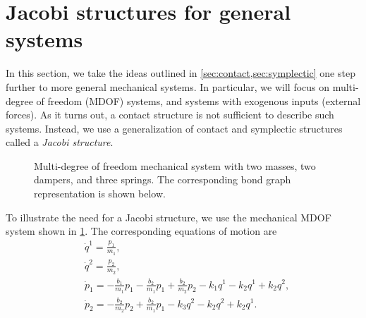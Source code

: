 \section{Jacobi structures for general systems}
\label{sec:jacobi}
In this section, we take the ideas outlined in \cref{sec:contact,sec:symplectic} one step further to more general mechanical systems. In particular, we will focus on multi-degree of freedom (MDOF) systems, and systems with exogenous inputs (external forces). As it turns out, a contact structure is not sufficient to describe such systems. Instead, we use a generalization of contact and symplectic structures called a \emph{Jacobi structure}.

\begin{figure}[ht!]
    \centering
    
    \caption{Multi-degree of freedom mechanical system with two masses, two dampers, and three springs. The corresponding bond graph representation is shown below.}
    \label{fig:mdof_oscillator}
\end{figure}

To illustrate the need for a Jacobi structure, we use the mechanical MDOF system shown in \cref{fig:mdof_oscillator}. The corresponding equations of motion are
\begin{equation}
    \begin{split}
        &\dot{q}^1 = \frac{p_1}{m_1}, \\
        &\dot{q}^2 = \frac{p_2}{m_2}, \\
        &\dot{p}_1 = -\frac{b_1}{m_1}p_1 - \frac{b_2}{m_1}p_1 + \frac{b_2}{m_2}p_2 - k_1 q^1 - k_2 q^1 + k_2 q^2, \\
        &\dot{p}_2 =  - \frac{b_2}{m_2}p_2 + \frac{b_2}{m_1}p_1 - k_3 q^2 - k_2 q^2 + k_2 q^1. \\
    \end{split}
\end{equation}

